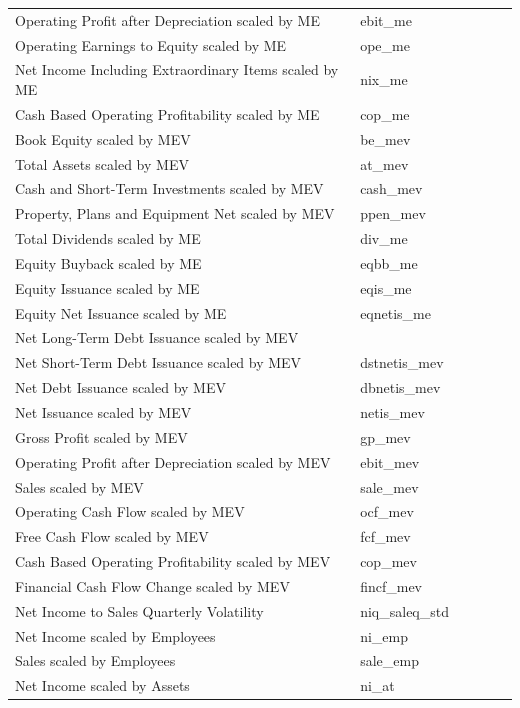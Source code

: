\documentclass[12pt,title,fleqn]{article}
\begin{document}
\begin{longtable}{p{5cm}p{2cm}p{5cm}lll}
Operating Profit after Depreciation scaled by ME & ebit\_me & & & & \\
Operating Earnings to Equity scaled by ME & ope\_me & & & & \\
Net Income Including Extraordinary Items scaled by ME & nix\_me & & & & \\
Cash Based Operating Profitability scaled by ME & cop\_me & & & & \\
Book Equity scaled by MEV & be\_mev & & & & \\
Total Assets scaled by MEV & at\_mev & & & & \\
Cash and Short-Term Investments scaled by MEV & cash\_mev & & & & \\
Property, Plans and Equipment Net scaled by MEV & ppen\_mev & & & & \\
Total Dividends scaled by ME & div\_me & & & & \\
Equity Buyback scaled by ME & eqbb\_me & & & & \\
Equity Issuance scaled by ME & eqis\_me & & & & \\
Equity Net Issuance scaled by ME & eqnetis\_me & & & & \\
Net Long-Term Debt Issuance scaled by MEV & & & & \\
Net Short-Term Debt Issuance scaled by MEV & dstnetis\_mev & & & & \\
Net Debt Issuance scaled by MEV & dbnetis\_mev & & & & \\
Net Issuance scaled by MEV & netis\_mev & & & & \\
Gross Profit scaled by MEV & gp\_mev & & & & \\
Operating Profit after Depreciation scaled by MEV & ebit\_mev & & & & \\
Sales scaled by MEV & sale\_mev & & & & \\
Operating Cash Flow scaled by MEV & ocf\_mev & & & & \\
Free Cash Flow scaled by MEV & fcf\_mev & & & & \\
Cash Based Operating Profitability scaled by MEV & cop\_mev & & & & \\
Financial Cash Flow Change scaled by MEV & fincf\_mev & & & & \\
Net Income to Sales Quarterly Volatility & niq\_saleq\_std & & & & \\
Net Income scaled by Employees & ni\_emp & & & & \\
Sales scaled by Employees & sale\_emp & & & & \\
Net Income scaled by Assets & ni\_at & & & & \\

\end{longtable}
\end{document}
